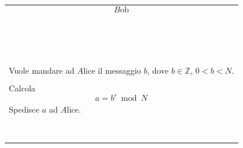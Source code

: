 \documentclass[a4paper,12pt, oneside]{book}
\begin{document}
\begin{minipage}{0.45\textwidth}
	\begin{tabular}{|p{\textwidth}}

		$$B\mbox{ob}$$\linebreak[2]                                                             \\\\\\\\\\\\\\\\\\\\\\\\\\\\\\\\\\

		Vuole mandare ad $A\mbox{lice}$ il messaggio $b$, dove $b \in \mathbb{Z}$, $0 < b < N$. \\\\
		Calcola $$a = b^r \bmod N $$                                                            \\
		Spedisce $a$ ad $A\mbox{lice}$.                                                         \\\\\\\\\\\\\\\\\\
	\end{tabular}
\end{minipage}%
\end{document}
